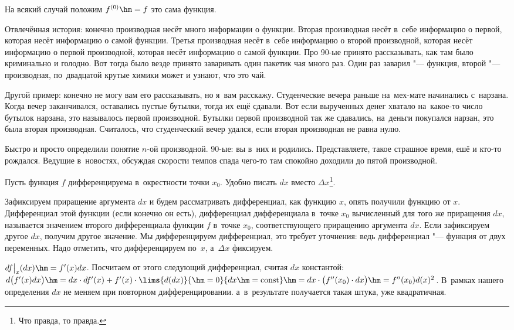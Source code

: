 \documentclass[a4paper,10pt,twoside]{article}
\begin{document}
На всякий случай положим $f^{(0)}\hm=f$ это сама функция.

Отвлечённая история: конечно производная несёт много информации о функции. Вторая производная несёт в~себе информацию о первой, которая несёт информацию о самой функции. Третья производная несёт в~себе информацию о второй производной, которая несёт информацию о первой производной, которая несёт информацию о самой функции. Про 90-ые принято рассказывать, как там было криминально и голодно. Вот тогда было везде принято заваривать один
пакетик чая много раз. Один раз заварил "--- функция, второй "--- производная, по~двадцатой крутые химики может и узнают, что это чай.

Другой пример: конечно не могу вам его рассказывать, но я~вам расскажу. Студенческие вечера раньше на~мех-мате начинались с~нарзана. Когда вечер заканчивался, оставались пустые бутылки, тогда их ещё сдавали. Вот если вырученных денег хватало на~какое-то число бутылок нарзана, это
называлось первой производной. Бутылки первой производной так же сдавались, на~деньги покупался нарзан, это была вторая производная.
Считалось, что студенческий вечер удался, если  вторая производная не равна нулю.

Быстро и просто определили понятие $n$-ой производной. 90-ые: вы в~них и родились. Представляете, такое страшное время, ешё и кто-то рождался. Ведущие в~новостях, обсуждая скорости темпов спада чего-то там спокойно доходили до пятой производной.

Пусть  функция $f$ дифференцируема в~окрестности точки $x_0$. Удобно писать $dx$ вместо $\Delta x$\footnote{Что правда, то правда.}.

Зафиксируем приращение аргумента $dx$ и будем рассматривать дифференциал, как функцию $x$, опять получили функцию от $x$.
Дифференциал этой функции (если конечно он есть), дифференциал дифференциала в~точке $x_0$ вычисленный для того же приращения $dx$,
называется значением второго дифференциала функции $f$ в~точке $x_0$, соответствующего приращению аргумента $dx$. Если зафиксируем другое
$dx$, получим другое значение. Мы дифференцируем дифференциал, это требует уточнения: ведь дифференциал "--- функция от двух переменных. Надо
отметить, что дифференцируем по~$x$, а~$\Delta x$ фиксируем.

$df\big|_x(dx)\hm=f'(x)dx$. Посчитаем от этого следующий дифференциал, считая $dx$ константой:
$d\big(f'(x)dx\big)\hm=dx\cdot df'(x)+f'(x)\cdot \lims{d(dx)}{\hm=0}{dx\hm=\mathrm{const}}\hm=dx\cdot\big(f''(x_0)\cdot dx\big)\hm=f''(x_0)d(x)^2$. В~рамках нашего определения $dx$ не меняем при повторном дифференцировании. а~в~результате получается такая штука, уже квадратичная.
\end{document}
